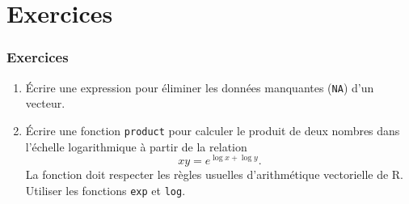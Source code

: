 \section{Exercices}

\begin{frame}
  \frametitle{Exercices}

  \begin{enumerate}
  \item Écrire une expression pour éliminer les données manquantes
    (\texttt{NA}) d'un vecteur.
  \item Écrire une fonction \texttt{product} pour calculer le produit de
    deux nombres dans l'échelle logarithmique à partir de la relation
    \begin{equation*}
      x y = e^{\log x + \log y}.
    \end{equation*}
    La fonction doit respecter les règles usuelles d'arithmétique
    vectorielle de R. Utiliser les fonctions \texttt{exp} et \texttt{log}.
  \end{enumerate}
\end{frame}


